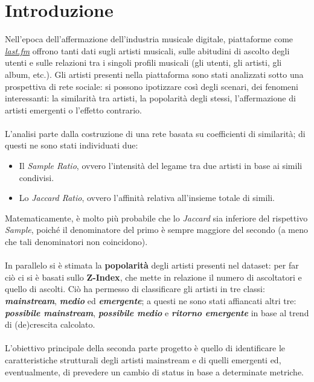 \documentclass[sigchi]{acmart}
\begin{document}
%


%
\maketitle

\section{Introduzione}
Nell'epoca dell'affermazione dell'industria musicale digitale, piattaforme come {\itshape \href{https://www.last.fm/home}{last.fm}} offrono tanti dati sugli artisti musicali, sulle abitudini di ascolto degli utenti e sulle relazioni tra i singoli profili musicali (gli utenti, gli artisti, gli album, etc.). Gli artisti presenti nella piattaforma sono stati analizzati sotto una prospettiva di rete sociale: si possono ipotizzare così degli scenari, dei fenomeni interessanti: la similarità tra artisti, la popolarità degli stessi, l'affermazione di artisti emergenti o l'effetto contrario. \\ \\ L'analisi parte dalla costruzione di una rete basata su coefficienti di similarità; di questi ne sono stati individuati due:

\begin{itemize}
\item Il {\itshape Sample Ratio}, ovvero l’intensità del legame tra due artisti in base ai simili condivisi.
\item Lo {\itshape Jaccard Ratio}, ovvero l’affinità relativa all’insieme totale di simili.
\end{itemize}
Matematicamente, è molto più probabile che lo {\itshape Jaccard} sia inferiore del rispettivo {\itshape Sample}, poiché il denominatore del primo è sempre maggiore del secondo (a meno che tali denominatori non coincidono). \\ \\ In parallelo si è stimata la {\bfseries popolarità} degli artisti presenti nel dataset: per far ciò ci si è basati sullo {\bfseries Z-Index}, che mette in relazione il numero di ascoltatori e quello di ascolti. Ciò ha permesso di classificare gli artisti in tre classi: {\bfseries \itshape mainstream}, {\bfseries \itshape medio} ed {\bfseries \itshape emergente}; a questi ne sono stati affiancati altri tre: {\bfseries \itshape possibile mainstream}, {\bfseries \itshape possibile medio} e {\bfseries \itshape ritorno emergente} in base al trend di (de)crescita calcolato. \\ \\ L'obiettivo principale della seconda parte progetto è quello di identificare le caratteristiche strutturali degli artisti mainstream e di quelli emergenti ed, eventualmente, di prevedere un cambio di status in base a determinate metriche.
\end{document}
